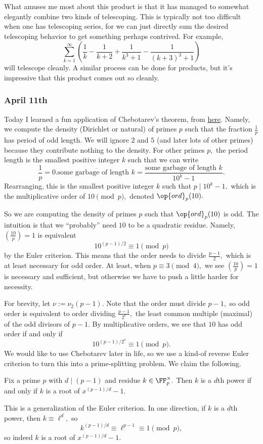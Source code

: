 What amuses me most about this product is that it has managed to somewhat elegantly combine two kinds of telescoping. This is typically not too difficult when one has telescoping series, for we can just directly sum the desired telescoping behavior to get something perhaps contrived. For example,
\[\sum_{k=1}^\infty\left(\frac1k-\frac1{k+2}+\frac1{k^3+1}-\frac1{(k+3)^3+1}\right)\]
will telescope cleanly. A similar process can be done for products, but it's impressive that this product comes out so cleanly.

\subsubsection{April 11th}
Today I learned a fun application of Chebotarev's theorem, from \href{https://web.archive.org/web/20190429062416/http://websites.math.leidenuniv.nl/algebra/Lenstra-Chebotarev.pdf}{here}. Namely, we compute the density (Dirichlet or natural) of primes $p$ such that the fraction $\frac1p$ has period of odd length. 
We will ignore $2$ and $5$ (and later lots of other primes) because they contribute nothing to the density. For other primes $p,$ the period length is the smallest positive integer $k$ such that we can write
\[\frac1p=0.\overline{\text{some garbage of length }k}=\frac{\text{some garbage of length }k}{10^k-1}.\]
Rearranging, this is the smallest positive integer $k$ such that $p\mid10^k-1,$ which is the multiplicative order of $10\pmod p,$ denoted $\op{ord}_p(10).$

So we are computing the density of primes $p$ such that $\op{ord}_p(10)$ is odd. The intuition is that we ``probably'' need $10$ to be a quadratic residue. Namely, $\left(\frac{10}p\right)=1$ is equivalent
\[10^{(p-1)/2}\equiv1\pmod p\]
by the Euler criterion. This means that the order needs to divide $\frac{p-1}2,$ which is at least necessary for odd order. At least, when $p\equiv3\pmod4,$ we see $\left(\frac{10}p\right)=1$ is necessary and sufficient, but otherwise we have to push a little harder for necessity.

For brevity, let $\nu:=\nu_2(p-1).$ Note that the order must divide $p-1,$ so odd order is equivalent to order dividing $\frac{p-1}{2^\nu},$ the least common multiple (maximal) of the odd divisors of $p-1.$ By multiplicative orders, we see that $10$ has odd order if and only if
\[10^{(p-1)/2^\nu}\equiv1\pmod p.\]
We would like to use Chebotarev later in life, so we use a kind-of reverse Euler criterion to turn this into a prime-splitting problem. We claim the following.
\begin{lemma}
    Fix a prime $p$ with $d\mid(p-1)$ and residue $k\in\FF_p^\times.$ Then $k$ is a $d$th power if and only if $k$ is a root of $x^{(p-1)/d}-1.$
\end{lemma}
This is a generalization of the Euler criterion. In one direction, if $k$ is a $d$th power, then $k\equiv\ell^d,$ so
\[k^{(p-1)/d}\equiv\ell^{p-1}\equiv1\pmod p,\]
so indeed $k$ is a root of $x^{(p-1)/d}-1.$

